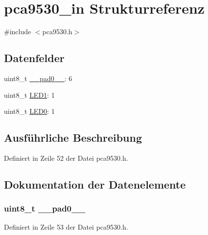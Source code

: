 \hypertarget{structpca9530__in}{}\section{pca9530\+\_\+in Strukturreferenz}
\label{structpca9530__in}


{\ttfamily \#include $<$pca9530.\+h$>$}

\subsection*{Datenfelder}
\begin{DoxyCompactItemize}
\item 
uint8\+\_\+t \hyperlink{structpca9530__in_a8b4eebe79ded0459acec2f4950102ba3}{\+\_\+\+\_\+pad0\+\_\+\+\_\+}\+: 6
\item 
uint8\+\_\+t \hyperlink{structpca9530__in_a40e423e01a324e06ebc015b85a9d6b8e}{L\+E\+D1}\+: 1
\item 
uint8\+\_\+t \hyperlink{structpca9530__in_a698763138aab81826861fd602c87872b}{L\+E\+D0}\+: 1
\end{DoxyCompactItemize}


\subsection{Ausführliche Beschreibung}


Definiert in Zeile 52 der Datei pca9530.\+h.



\subsection{Dokumentation der Datenelemente}
\hypertarget{structpca9530__in_a8b4eebe79ded0459acec2f4950102ba3}{}
\subsubsection[{\+\_\+\+\_\+pad0\+\_\+\+\_\+}]{\setlength{\rightskip}{0pt plus 5cm}uint8\+\_\+t \+\_\+\+\_\+pad0\+\_\+\+\_\+}\label{structpca9530__in_a8b4eebe79ded0459acec2f4950102ba3}


Definiert in Zeile 53 der Datei pca9530.\+h.

\hypertarget{structpca9530__in_a698763138aab81826861fd602c87872b}{}
